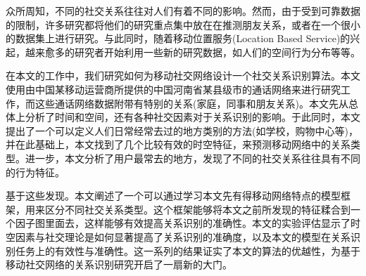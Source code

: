 
\begin{cabstract}
众所周知，不同的社交关系往往对人们有着不同的影响。然而，由于受到可靠数据的限制，许多研究都将他们的研究重点集中放在在推测朋友关系，或者在一个很小的数据集上进行研究。与此同时，随着移动位置服务(Location Based Service)的兴起，越来愈多的研究者开始利用一些新的研究数据，如人们的空间行为分布等等。

在本文的工作中，我们研究如何为移动社交网络设计一个社交关系识别算法。本文使用由中国某移动运营商所提供的中国河南省某县级市的通话网络来进行研究工作，而这些通话网络数据附带有特别的关系(家庭，同事和朋友关系)。本文先从总体上分析了时间和空间，还有各种社交因素对于关系识别的影响。于此同时，本文提出了一个可以定义人们日常经常去过的地方类别的方法(如学校，购物中心等)，并在此基础上，本文找到了几个比较有效的时空特征，来预测移动网络中的关系类型。进一步，本文分析了用户最常去的地方，发现了不同的社交关系往往具有不同的行为特征。

基于这些发现。本文阐述了一个可以通过学习本文先有得移动网络特点的模型框架，用来区分不同社交关系类型。这个框架能够将本文之前所发现的特征糅合到一个因子图里面去，这样能够有效提高关系识别的准确性。本文的实验评估显示了时空因素与社交理论是如何显著提高了关系识别的准确度，以及本文的模型在关系识别任务上的有效性与准确性。这一系列的结果证实了本文的算法的优越性，为基于移动社交网络的关系识别研究开启了一扇新的大门。

\end{cabstract}

